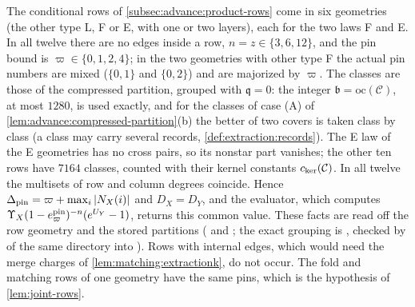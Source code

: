 \begin{remark}\label{rem:pinned-instances}
The conditional rows of \cref{subsec:advance:product-rows} come in six geometries
(the other type L, F or E, with one or two layers), each for the two laws F and E.
In all twelve there are no edges inside a row, $n=z\in\{3,6,12\}$, and the pin bound
is $\varpi\in\{0,1,2,4\}$; in the two geometries with other type F the actual pin
numbers are mixed ($\{0,1\}$ and $\{0,2\}$) and are majorized by $\varpi$. The classes are those of
the compressed partition, grouped with $\mathfrak q=0$: the integer
$\mathfrak b=\mathrm{oc}(\mathcal C)$, at most $1280$, is used exactly, and for the
classes of case (A) of \cref{lem:advance:compressed-partition}(b) the better of two
covers is taken class by class (a class may carry several records,
\cref{def:extraction:records}). The E law of the E geometries has no cross pairs, so
its nonstar part vanishes; the other ten rows have $7164$ classes, counted with their
kernel constants $c_{\rm ker}(\mathcal C)$. In all twelve the multisets of row and
column degrees coincide. Hence $\Delta_{\rm pin}=\varpi+\max_i|N_X(i)|$ and
$D_X=D_Y$, and the evaluator, which computes
$\Upsilon_X(1-e^{\rm pin}_\varpi)^{-n}(e^{U_Y}-1)$, returns this common value. These
facts are read off the row geometry and the stored partitions
( and
; the exact grouping is
, checked by
 of the same directory into
). Rows with internal edges, which would need
the merge charges of \cref{lem:matching:extractionk}, do not occur. The fold and
matching rows of one geometry have the same pins, which is the hypothesis of
\cref{lem:joint-rows}.
\end{remark}

